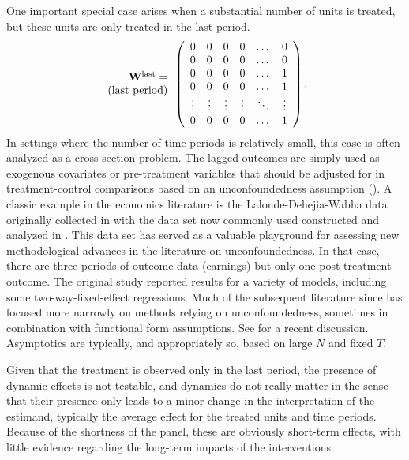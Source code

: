 \documentclass[letterpaper,12pt,leqno]{article}
\newcommand{\last}{{\rm last}}
\newcommand{\ttock}{1}
\newcommand{\ttick}{0}
\newcommand{\bw}{{\bf W}}
\begin{document}
One important special case arises when a substantial number of units is treated, but these units are only treated in the last period. 
\[
\begin{array}{r}\bw^\last=\\ 
({\rm last\ period})
\end{array}\left(
\begin{array}{cccccccc}
	 \ttick &  \ttick & \ttick  & \ttick & \dots & \ttick \\
	\ttick  & \ttick &  \ttick & \ttick   & \dots & \ttick  \\
	 \ttick  & \ttick &  \ttick  & \ttick  & \dots & \ttock  \\
	 \ttick  & \ttick & \ttick &  \ttick   & \dots &  {\ttock}  \\
	\vdots   &  \vdots  &  \vdots& \vdots &\ddots &\vdots \\
	 \ttick  & \ttick &  \ttick   & \ttick & \dots & {{\ttock}}  \\
\end{array}
\right).
\]
In settings where the number of time periods is relatively small, this case is often analyzed as a cross-section problem. The lagged outcomes are simply used as exogenous covariates or pre-treatment variables that should be adjusted for in treatment-control comparisons based on an unconfoundedness assumption (\citealp{rosenbaum1983central}). A classic example in the economics literature is the Lalonde-Dehejia-Wabha data originally collected in \citep{lalonde1986evaluating} with the data set now commonly used constructed and analyzed in \citep{dehejiawahba}.
This data set has served as a valuable playground for assessing new methodological advances in the literature on unconfoundedness.
In that case, there are three periods of outcome data (earnings) but only one post-treatment outcome. The original study \citep{lalonde1986evaluating} reported results for a variety of models, including some two-way-fixed-effect regressions. Much of the subsequent literature since \citep{dehejiawahba, dehejia2002propensity} has focused more narrowly on methods relying on unconfoundedness, sometimes in combination with functional form assumptions. See \citep{imbens2024lalonde} for a recent discussion. Asymptotics are typically, and appropriately so, based on large $N$ and fixed $T$.

Given that the treatment is observed only in the last period, the presence of dynamic effects is not testable, and dynamics do not really matter in the sense that their presence only leads to a minor change in the interpretation of the estimand, typically the average effect for the treated units and time periods. Because of the shortness of the panel, these are obviously short-term effects, with little evidence regarding the long-term impacts of the interventions.
\end{document}
